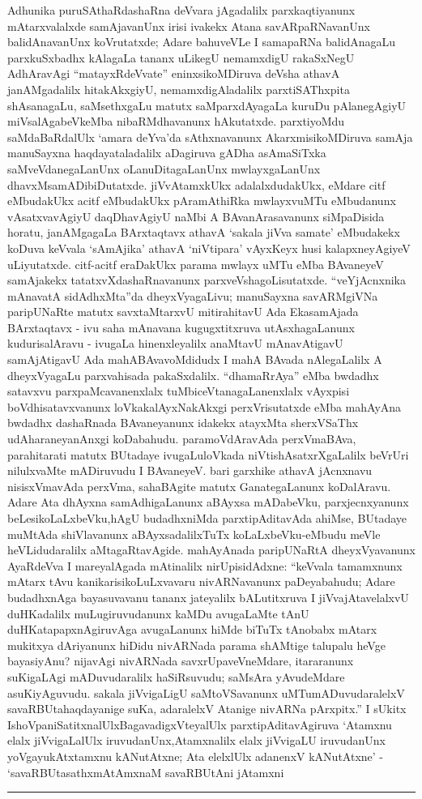 Adhunika puruSAthaRdashaRna deVvara jAgadalilx parxkaqtiyanunx mAtarxvalalxde samAja\-vanUnx irisi ivakekx Atana savARpaRNavanUnx balidAnavanUnx koVrutatxde; Adare bahuveVLe I samapaRNa balidAnagaLu parxkuSxbadhx kAlagaLa tananx uLikegU nemamxdigU rakaSxNegU AdhAravAgi ``matayxRdeVvate'' eninxsikoMDiruva deVsha athavA janAMgadalilx hita\break\-kAkxgiyU, nemamxdigAladalilx parxtiSAThxpita shAsanagaLu, saMsethxgaLu matutx saMparxdAya\-gaLa kuruDu pAlanegAgiyU miVsalAgabeVkeMba nibaRMdhavanunx hAkutatxde. parxtiyoMdu saMdaBaRdalUlx `amara deYva'da sAthxnavanunx AkarxmisikoMDiruva samAja manuSayxna haqdayataladalilx aDagiruva gADha asAmaSiTxka saMveVdanegaLanUnx oLanuDitagaLanUnx mwlayxgaLanUnx dhavxMsamADibiDutatxde. jiVvAtamxkUkx adalalxdudakUkx, eMdare citf eMbu\-dakUkx acitf eMbudakUkx pAramAthiRka mwlayxvuMTu eMbudanunx vAsatxvavAgiyU daqDhavAgiyU naMbi A BAvanArasavanunx siMpaDisida horatu, janAMgagaLa BArxtaqtavx athavA `sakala jiVva samate' eMbudakekx koDuva keVvala `sAmAjika' athavA `niVtipara' vAyxKeyx husi kalapxneyAgiyeV uLiyutatxde. citf-acitf eraDakUkx parama mwlayx uMTu eMba BAvaneyeV samAjakekx tatatxvXdashaRnavanunx parxveVshagoLisutatxde. ``veYjAcnx\-nika mAnavatA sidAdhxMta''da dheyxVyagaLivu; manuSayxna savARMgiVNa paripUNaRte matutx savxtaMtarxvU mitirahitavU Ada EkasamAjada BArxtaqtavx - ivu saha mAnavana kugugx\-titxruva utAsxhagaLanunx kudurisalAravu - ivugaLa hinenxleyalilx anaMtavU mAna\-vAtigavU samAjAtigavU Ada mahABAvavoMdidudx I mahA BAvada nAlegaLalilx A dheyxVya\-gaLu parxvahisada pakaSxdalilx. ``dhamaRrAya'' eMba bwdadhx satavxvu parxpaMcavanenxlalx tuMbi\break ceVtanagaLanenxlalx vAyxpisi boVdhisatavxvanunx loVkakalAyxNakAkxgi perxVrisutatxde eMba mahA\-yAna bwdadhx dashaRnada BAvaneyanunx idakekx atayxMta sherxVSaThx udAharaneyanAnxgi koDa\-bahudu. paramoVdAravAda perxVmaBAva, parahitarati matutx BUtadaye ivu\-gaLu\break loVkada niVtishAsatxrXgaLalilx beVrUri nilulxvaMte mADiruvudu I BAvaneyeV. bari \hbox{garxhike} athavA jAcnxnavu nisisxVmavAda perxVma, sahaBAgite matutx GanategaLanunx koDa\-lAravu. Adare Ata dhAyxna samAdhigaLanunx aBAyxsa mADabeVku, parxjecnxyanunx beLesi\-koLaLxbeVku,\break hAgU budadhxniMda parxtipAditavAda ahiMse, BUtadaye muMtAda shiVla\-vanunx aBAyxsa\-dalilxTuTx koLaLxbeVku-eMbudu meVle heVLidudaralilx aMtagaRtavAgide. mahAyAnada paripUNaRtA dheyxVyavanunx AyaRdeVva I mareyalAgada mAti\-nalilx nirUpisidAdxne: ``keVvala tamamxnunx mAtarx tAvu kanikarisikoLuLxvavaru nivARNa\-vanunx paDeyabahudu; Adare budadhxnAga bayasuvavanu tananx jateyalilx bALutitxruva I jiVvajAtavelalxvU duHKadalilx muLugiruvudanunx kaMDu avugaLaMte tAnU duHKa\-tapapxnAgiruvAga avu\-gaLanunx hiMde biTuTx tAnobabx mAtarx mukitxya dAriyanunx hiDidu nivARNada parama shAMtige talupalu heVge bayasiyAnu? nijavAgi nivARNada savxrUpaveVneMdare, itararanunx suKigaLAgi mADuvudaralilx haSiRsuvudu; saMsAra yAvudeMdare asuKi\-yAguvudu. sakala jiVvigaLigU saMtoVSavanunx uMTu\-mADuvudaralelxV savaR\-BUta\-haqdayanige suKa, adaralelxV Atanige nivARNa pArxpitx.'' I sUkitx IshoVpaniSatitx\-nalUlx\break BagavadigxVteyalUlx parxtipAditavAgiruva `Atamxnu elalx jiVvigaLalUlx iruvudanUnx,\break Atamxnalilx elalx jiVvigaLU iruvudanUnx yoVgayukAtxtamxnu kANutAtxne; Ata elelxlUlx adanenxV kANutAtxne' - `savaRBUtasathxmAtAmxnaM savaRBUtAni jAtamxni {\rm \rule{.03cm}{.2cm}} 